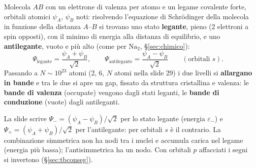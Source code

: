 \documentclass[11pt,a4paper]{article}
\begin{document}
Molecola $AB$ con un elettrone di valenza per atomo e un legame covalente forte, orbitali atomici $\psi_A$, $\psi_B$ noti: risolvendo l'equazione di
Schrödinger della molecola in funzione della distanza $A$--$B$ si trovano uno stato \textbf{legante}, pieno (2 elettroni a spin opposti), con il
minimo di energia alla distanza di equilibrio, e uno \textbf{antilegante}, vuoto e più alto (come per $\mathrm{Na_2}$, §\ref{sec:chimico}):
\[
\Psi_{\text{legante}}=\frac{\psi_A+\psi_B}{\sqrt2},\qquad\Psi_{\text{antilegante}}=\frac{\psi_A-\psi_B}{\sqrt2}\qquad(\text{orbitali }s).
\]
Passando a $N\sim10^{23}$ atomi (2, 6, $N$ atomi nella slide 29) i due livelli si \textbf{allargano in bande} e tra le due si apre un gap, fissato
da struttura cristallina e valenza: le \textbf{bande di valenza} (occupate) vengono dagli stati leganti, le \textbf{bande di conduzione} (vuote)
dagli antileganti.
\begin{osservazione}
La slide scrive $\Psi_-=(\psi_A-\psi_B)/\sqrt2$ per lo stato legante (energia $\varepsilon_-$) e $\Psi_+=(\psi_A+\psi_B)/\sqrt2$ per l'antilegante:
per orbitali $s$ è il contrario. La combinazione simmetrica non ha nodi tra i nuclei e accumula carica nel legame (energia più bassa);
l'antisimmetrica ha un nodo. Con orbitali $p$ affacciati i segni si invertono (§\ref{sec:tbconseg}).
\end{osservazione}
\end{document}
